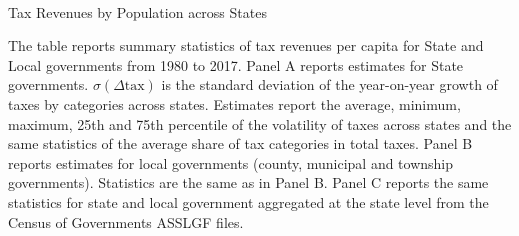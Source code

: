 \begin{table} %
\begin{center}
\begin{threeparttable}

\caption{\\ Tax Revenues by Population across States}
\label{table:taxrev2}

\centering 

\begin{small}

  

\end{small}

\begin{footnotesize}
\begin{tablenotes}
\item The table reports summary statistics of tax revenues per capita for State and Local governments from 1980 to 2017. Panel A reports estimates for State governments. $\sigma(\Delta\text{tax})$ is the standard deviation of the year-on-year growth of taxes by categories across states. Estimates report the average, minimum, maximum, 25th and 75th percentile of the volatility of taxes across states and the same statistics of the average share of tax categories in total taxes. Panel B reports estimates for local governments (county, municipal and township governments). Statistics are the same as in Panel B. Panel C reports the same statistics for state and local government aggregated at the state level from the Census of Governments ASSLGF files.
\end{tablenotes}
\end{footnotesize}
\end{threeparttable}
\end{center}
\end{table}
\thispagestyle{empty}




